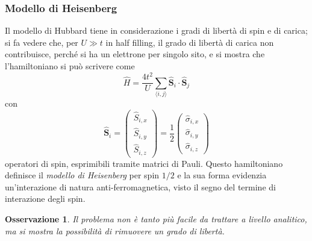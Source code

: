 \documentclass[11pt, a4paper]{scrartcl}
\theoremstyle{style}
\newtheorem{osservazione}{Osservazione}[section]
\theoremstyle{style1}
\numberwithin{equation}{subsection}
\begin{document}
\subsubsection{Modello di Heisenberg}
Il modello di Hubbard tiene in considerazione i gradi di libert\`a di spin e di carica; si fa vedere che, per $U \gg t$ in half filling, il grado di libert\`a di carica non contribuisce, perch\'e si ha un elettrone per singolo sito, e si mostra che l'hamiltoniano si pu\`o scrivere come
\[
\hat{H} =  \frac{4t^2}{U} \sum_{\langle i,j \rangle}^{} \hat{\mathbf{S} }_i \cdot \hat{\mathbf{S} }_j
\] 
con 
\[
\hat{\mathbf{S} }_i = \begin{pmatrix} \hat{S}_{i,x} \\ \hat{S}_{i,y} \\ \hat{S}_{i,z}  \end{pmatrix} = \frac{1}{2} \begin{pmatrix} \hat{\sigma }_{i,x} \\ \hat{\sigma }_{i,y} \\ \hat{\sigma }_{i,z}  \end{pmatrix} 
\] 
operatori di spin, esprimibili tramite matrici di Pauli. 
Questo hamiltoniano definisce il \textit{modello di Heisenberg} per spin $1 / 2$ e la sua forma evidenzia un'interazione di natura anti-ferromagnetica, visto il segno del termine di interazione degli spin.
\begin{osservazione}
Il problema non \`e tanto pi\`u facile da trattare a livello analitico, ma si mostra la possibilit\`a di rimuovere un grado di libert\`a.
\end{osservazione}
\end{document}

